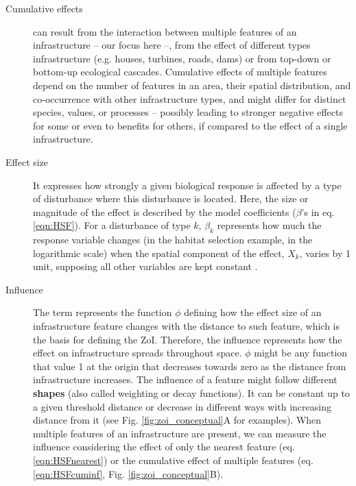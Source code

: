 \documentclass[titlepage]{article}
\begin{document}
{\begin{tcolorbox}[width=1.3\textwidth,center,colback=yellow!5,colframe=yellow!75!black,title={Box 1 -- Definitions}]
\begin{description}
    \item[Cumulative effects] can result from the interaction between multiple features of an infrastructure -- our focus here --, from the effect of different types infrastructure (e.g. houses, turbines, roads, dams) or from top-down or bottom-up ecological cascades. Cumulative effects of multiple features depend on the number of features in an area, their spatial distribution, and co-occurrence with other infrastructure types, and might differ for distinct species, values, or processes -- possibly leading to stronger negative effects for some or even to benefits for others, if compared to the effect of a single infrastructure.
    
    \item[Effect size] It expresses how strongly a given biological response is affected by a type of disturbance where this disturbance is located. Here, the size or magnitude of the effect is described by the model coefficients ($\beta$'s in eq. \ref{eqn:HSF}). For a disturbance of type $k$, $\beta_k$ represents how much the response variable changes (in the habitat selection example, in the logarithmic scale) when the spatial component of the effect, $X_k$, varies by 1 unit, supposing all other variables are kept constant \citep{fieberg_how_2021}.
    
    \item[Influence] The term represents the function $\phi$ defining how the effect size of an infrastructure feature changes with the distance to such feature, which is the basis for defining the ZoI. Therefore, the influence represents how the effect on infrastructure spreads throughout space. $\phi$ might be any function that value 1 at the origin that decreases towards zero as the distance from infrastructure increases. The influence of a feature might follow different \textbf{shapes} (also called weighting or decay functions). It can be constant up to a given threshold distance or decrease in different ways with increasing distance from it (see Fig. \ref{fig:zoi_conceptual}A for examples). When multiple features of an infrastructure are present, we can measure the influence considering the effect of only the nearest feature (eq. \ref{eqn:HSFnearest}) or the cumulative effect of multiple features (eq. \ref{eqn:HSFcuminf}, Fig. \ref{fig:zoi_conceptual}B).
    

\end{description}
\end{tcolorbox}}
\end{document}
